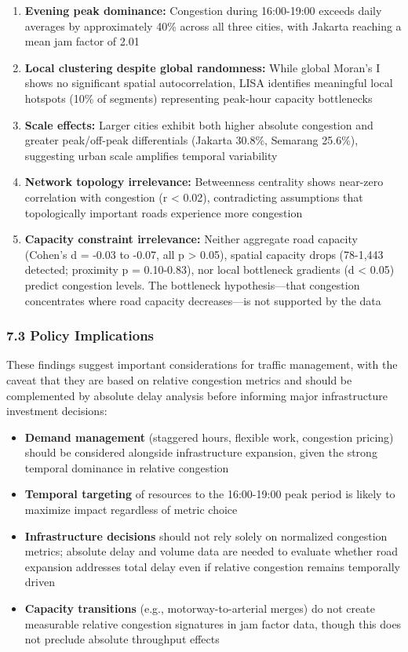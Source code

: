 \begin{enumerate}
\def\labelenumi{\arabic{enumi}.}
\item
  \textbf{Evening peak dominance:} Congestion during 16:00-19:00 exceeds daily averages by approximately 40\% across all three cities, with Jakarta reaching a mean jam factor of 2.01
\item
  \textbf{Local clustering despite global randomness:} While global Moran's I shows no significant spatial autocorrelation, LISA identifies meaningful local hotspots (10\% of segments) representing peak-hour capacity bottlenecks
\item
  \textbf{Scale effects:} Larger cities exhibit both higher absolute congestion and greater peak/off-peak differentials (Jakarta 30.8\%, Semarang 25.6\%), suggesting urban scale amplifies temporal variability
\item
  \textbf{Network topology irrelevance:} Betweenness centrality shows near-zero correlation with congestion (r \textless{} 0.02), contradicting assumptions that topologically important roads experience more congestion
\item
  \textbf{Capacity constraint irrelevance:} Neither aggregate road capacity (Cohen's d = -0.03 to -0.07, all p \textgreater{} 0.05), spatial capacity drops (78-1,443 detected; proximity p = 0.10-0.83), nor local bottleneck gradients (\textbar d\textbar{} \textless{} 0.05) predict congestion levels. The bottleneck hypothesis---that congestion concentrates where road capacity decreases---is not supported by the data
\end{enumerate}

\subsubsection{7.3 Policy Implications}\label{policy-implications}

These findings suggest important considerations for traffic management, with the caveat that they are based on relative congestion metrics and should be complemented by absolute delay analysis before informing major infrastructure investment decisions:

\begin{itemize}
\tightlist
\item
  \textbf{Demand management} (staggered hours, flexible work, congestion pricing) should be considered alongside infrastructure expansion, given the strong temporal dominance in relative congestion
\item
  \textbf{Temporal targeting} of resources to the 16:00-19:00 peak period is likely to maximize impact regardless of metric choice
\item
  \textbf{Infrastructure decisions} should not rely solely on normalized congestion metrics; absolute delay and volume data are needed to evaluate whether road expansion addresses total delay even if relative congestion remains temporally driven
\item
  \textbf{Capacity transitions} (e.g., motorway-to-arterial merges) do not create measurable relative congestion signatures in jam factor data, though this does not preclude absolute throughput effects
\end{itemize}

